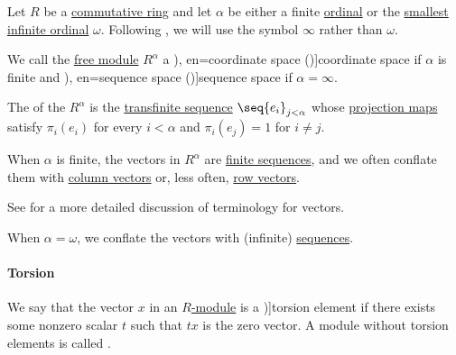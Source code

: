 \begin{definition}\label{def:sequence_space}\mimprovised
  Let \( R \) be a \hyperref[def:ring/commutative]{commutative ring} and let \( \alpha \) be either a finite \hyperref[def:ordinal]{ordinal} or the \hyperref[thm:omega_is_an_ordinal]{smallest infinite ordinal} \( \omega \). Following , we will use the symbol \( \infty \) rather than \( \omega \).

  We call the \hyperref[def:free_semimodule]{free module} \( R^\alpha \) a \term[ru=координатное пространство (\cite[443]{ИльинСадовничийСендов1985АнализТом1}), en=coordinate space (\cite[rem. 2.8]{Treil2017LinearAlgebra})]{coordinate space} if \( \alpha \) is finite and \term[ru=пространство последовательностей (вещественных чисел) (\cite[452]{Фихтенгольц1968ОсновыТом2}), en=sequence space (\cite[example 1.1.4]{Roman2005LinearAlgebra})]{sequence space} if \( \alpha = \infty \).

  The  of the \( R^\alpha \) is the \hyperref[def:transfinite_sequence]{transfinite sequence} \( \seq{ e_i }_{j < \alpha} \) whose \hyperref[def:basis_decomposition]{projection maps} satisfy \( \pi_i(e_i) \) for every \( i < \alpha \) and \( \pi_i(e_j) = 1 \) for \( i \neq j \).

  When \( \alpha \) is finite, the vectors in \( R^\alpha \) are \hyperref[def:sequence]{finite sequences}, and we often conflate them with \hyperref[def:array/column_vector]{column vectors} or, less often, \hyperref[def:array/row_vector]{row vectors}.
\end{definition}
\begin{comments}
  \item See  for a more detailed discussion of terminology for vectors.
  \item When \( \alpha = \omega \), we conflate the vectors with (infinite) \hyperref[def:sequence]{sequences}.
\end{comments}

\paragraph{Torsion}

\begin{definition}\label{def:module_torsion}
  We say that the vector \( x \) in an \hyperref[def:module]{\( R \)-module} is a \term[ru=элемент кручения (\cite[57]{Шафаревич1999Алгебра})]{torsion element} if there exists some nonzero scalar \( t \) such that \( tx \) is the zero vector. A module without torsion elements is called .
\end{definition}

